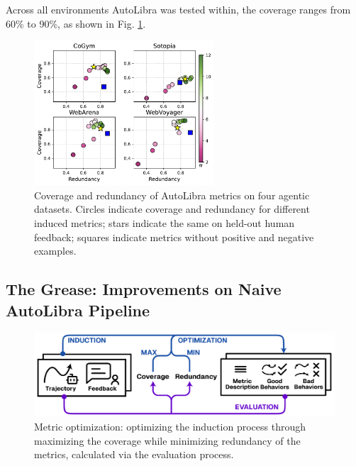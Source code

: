 Across all environments AutoLibra was tested within, the coverage ranges from 60\% to 90\%, as shown in Fig. \ref{fig:coverage-redundancy}.

\begin{figure}
    \vspace{-15pt}
    \includegraphics[width=0.6\textwidth]{figs/four_datasets_grid.pdf}
    \vspace{-20pt}  
    \caption{Coverage and redundancy of AutoLibra metrics on four agentic datasets. Circles indicate coverage
    and redundancy for different induced metrics; stars indicate the same on held-out human feedback; squares indicate metrics without positive and negative examples.}
    \label{fig:coverage-redundancy}
\end{figure}

\subsection{The Grease: Improvements on Naive AutoLibra Pipeline}
\begin{figure}[!t]
    \centering
    \includegraphics[width=0.8\linewidth]{figs/autolibra_optimization.pdf}
    \caption{Metric optimization: optimizing the induction process through maximizing the coverage while minimizing redundancy of the metrics, calculated via the evaluation process.}
    \label{fig:enter-label}
\end{figure}

